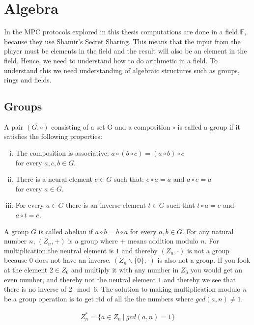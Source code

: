 \section{Algebra}
In the MPC protocols explored in this thesis computations are done in a field $\mathbb{F}$, because they use Shamir's Secret Sharing. This means that the input from the player must be elements in the field and the result will also be an element in the field. Hence, we need to understand how to do arithmetic in a field. To understand this we need understanding of algebraic structures such as groups, rings and fields\cite{algebra}.

\subsection{Groups}
A pair $(G, \circ)$ consisting of a set G and a composition $\circ$ is called a group if it satisfies the following properties:

\begin{enumerate}[(i)]
    \item The composition is associative: $a \circ (b \circ c) = (a \circ b) \circ c$ \\
    for every $a, c, b \in G$. 
     \item There is a neural element $e \in G$ such that: $e \circ a = a$ and $a \circ e = a$ \\
    for every $a \in G$. 
     \item For every $a \in G$ there is an inverse element $t \in G$ such that $t \circ a = e$ and $a \circ t = e$.
\end{enumerate} 
\noindent A group $G$ is called abelian if $a \circ b = b \circ a$ for every $a, b \in G$. For any natural number $n$, $(Z_n, +)$ is a group where $+$ means addition modulo $n$. For multiplication the neutral element is $1$ and thereby $(Z_n, \cdot)$ is not a group because $0$ does not have an inverse. $(Z_n\backslash \{0\}, \cdot)$ is also not a group. If you look at the element $2 \in Z_6$ and multiply it with any number in $Z_6$ you would get an even number, and thereby not the neutral element $1$ and thereby we see that there is no inverse of $2 \mod 6$. The solution to making multiplication modulo $n$ be a group operation is to get rid of all the the numbers where $gcd(a,n) \neq 1$.

\begin{align*}
     Z^*_n=\{a \in Z_n\ |\ gcd(a,n)=1\}
\end{align*} 

